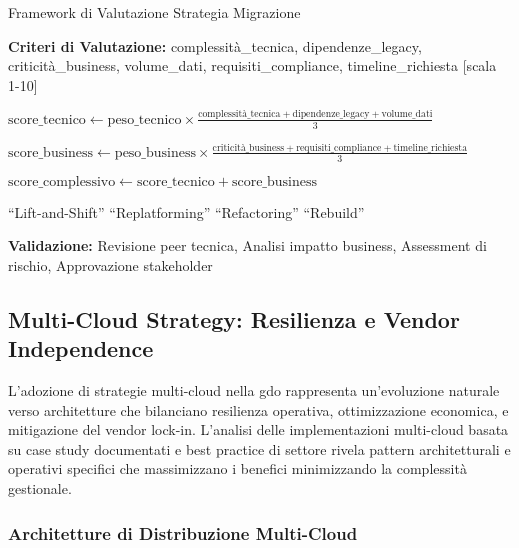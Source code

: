 \begin{algorithm}[H]
\caption{Framework di Valutazione Strategia Migrazione}
\label{alg:valutazione-migrazione}
\begin{algorithmic}[1]
\State \textbf{Criteri di Valutazione:} complessità\_tecnica, dipendenze\_legacy, criticità\_business, volume\_dati, requisiti\_compliance, timeline\_richiesta [scala 1-10]

    \State $\text{score\_tecnico} \leftarrow \text{peso\_tecnico} \times \frac{\text{complessità\_tecnica} + \text{dipendenze\_legacy} + \text{volume\_dati}}{3}$
    
    \State $\text{score\_business} \leftarrow \text{peso\_business} \times \frac{\text{criticità\_business} + \text{requisiti\_compliance} + \text{timeline\_richiesta}}{3}$
    
    \State $\text{score\_complessivo} \leftarrow \text{score\_tecnico} + \text{score\_business}$
    
        \State \Return ``Lift-and-Shift''
        \State \Return ``Replatforming''
        \State \Return ``Refactoring''
    \Else
        \State \Return ``Rebuild''
    \EndIf
\EndFunction

\State \textbf{Validazione:} Revisione peer tecnica, Analisi impatto business, Assessment di rischio, Approvazione stakeholder
\end{algorithmic}
\end{algorithm}

\subsection{Multi-Cloud Strategy: Resilienza e Vendor Independence}
\label{subsec:multi-cloud-strategy}

L'adozione di strategie multi-cloud nella \gls{gdo} rappresenta un'evoluzione naturale verso architetture che bilanciano resilienza operativa, ottimizzazione economica, e mitigazione del vendor lock-in. L'analisi delle implementazioni multi-cloud basata su case study documentati e best practice di settore rivela pattern architetturali e operativi specifici che massimizzano i benefici minimizzando la complessità gestionale.

\subsubsection{Architetture di Distribuzione Multi-Cloud}

